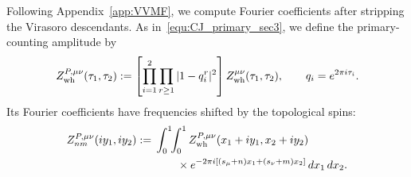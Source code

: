 \documentclass[11pt]{article}
\numberwithin{equation}{section}
\newcommand{\Zwh}{Z_{\rm wh}}
\begin{document}
Following Appendix~\ref{app:VVMF}, we compute Fourier coefficients
after stripping the Virasoro descendants. As in~\eqref{equ:CJ_primary_sec3},
we define the primary-counting amplitude by
\begin{equation}
Z_{\rm wh}^{P,\mu\nu}(\tau_1,\tau_2)
:=\left[\prod_{i=1}^2\prod_{r\geq1}|1-q_i^r|^2\right]
\Zwh^{\mu\nu}(\tau_1,\tau_2),
\qquad q_i=e^{2\pi i\tau_i}.
\end{equation}
Its Fourier coefficients have frequencies shifted by the topological spins:
\begin{equation}\label{eq:Fourier}
\begin{split}
Z_{nm}^{P,\mu\nu}(iy_1,iy_2)
:={}&\int_0^1\!\!\int_0^1
Z_{\rm wh}^{P,\mu\nu}(x_1+iy_1,x_2+iy_2)\\
&\qquad\times
e^{-2\pi i[(s_\mu+n)x_1+(s_\nu+m)x_2]}\,dx_1\,dx_2.
\end{split}
\end{equation}
\end{document}
